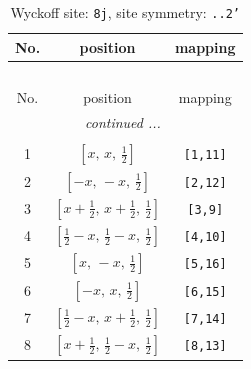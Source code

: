 \documentclass[fleqn,8pt]{jsarticle}
\begin{document}
\begin{longtable}{ccc}
\caption{Wyckoff site: {\tt 8j}, site symmetry: {\tt ..2'}}
 \\
 \hline \hline
No. & position & mapping \\ \hline \endfirsthead

\multicolumn{2}{l}{\tablename\ \thetable{}} \\
 \hline \hline
No. & position & mapping \\ \hline \endhead

 \hline \hline
\multicolumn{2}{r}{\footnotesize\it continued ...} \\ \endfoot

 \hline \hline
\multicolumn{2}{r}{} \\ \endlastfoot

1 & $\left[ x,\, x,\, \frac{1}{2} \right]$ & {\tt [1,11]} \\ \hline
2 & $\left[ - x,\, - x,\, \frac{1}{2} \right]$ & {\tt [2,12]} \\ \hline
3 & $\left[ x + \frac{1}{2},\, x + \frac{1}{2},\, \frac{1}{2} \right]$ & {\tt [3,9]} \\ \hline
4 & $\left[ \frac{1}{2} - x,\, \frac{1}{2} - x,\, \frac{1}{2} \right]$ & {\tt [4,10]} \\ \hline
5 & $\left[ x,\, - x,\, \frac{1}{2} \right]$ & {\tt [5,16]} \\ \hline
6 & $\left[ - x,\, x,\, \frac{1}{2} \right]$ & {\tt [6,15]} \\ \hline
7 & $\left[ \frac{1}{2} - x,\, x + \frac{1}{2},\, \frac{1}{2} \right]$ & {\tt [7,14]} \\ \hline
8 & $\left[ x + \frac{1}{2},\, \frac{1}{2} - x,\, \frac{1}{2} \right]$ & {\tt [8,13]} \\
\end{longtable}
\renewcommand{\arraystretch}{1.2}
\end{document}
